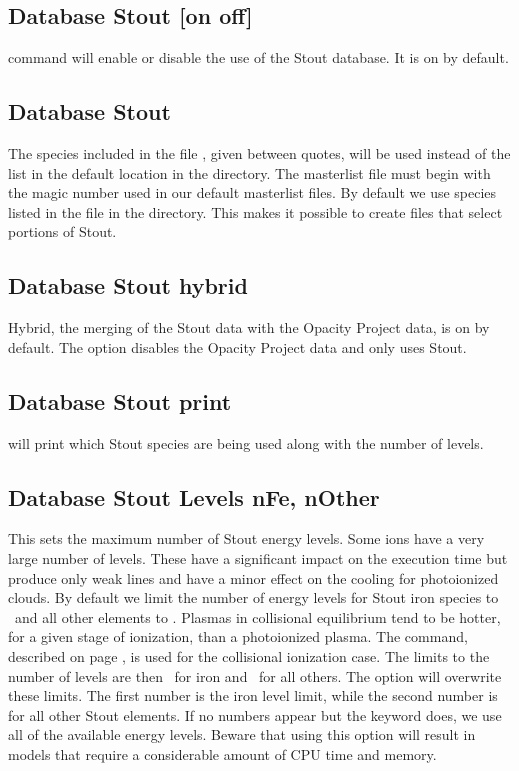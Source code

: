 \subsection{Database Stout [on off]} 
command will enable or disable the use of the Stout database.
It is on by default.

\subsection{Database Stout }
The species included in the file , given between quotes, will be used
instead of the list in the default location in the  directory.
The masterlist file must begin with the magic number used in our default masterlist files.
By default we use species listed in the  file in the 
 directory.
This makes it possible to create  files that select portions of Stout.

\subsection{Database Stout hybrid} 
Hybrid, the merging of the Stout data with the Opacity Project data, 
is on by default.
The  option disables the Opacity Project data 
and only uses Stout.

\subsection{Database Stout print} 
will print which Stout species are being used
along with the number of levels.

\subsection{Database Stout Levels nFe, nOther} 
This sets the maximum number of Stout energy levels. 
Some ions have a very large number of levels.
These have a significant impact
on the execution time but produce only weak lines and have a minor effect
on the cooling for photoionized clouds.
By default we limit the number of energy levels for Stout iron species to 
\nDefaultPhotoLevelsFe\ and all other elements to \nDefaultPhotoLevels.
Plasmas in collisional equilibrium tend to be hotter, for a given
stage of ionization, than a photoionized plasma.  
The  command, described on
page \pageref{sec:CommandCoronalEquilibrium}, is used for
the collisional ionization case.
The limits to the number of levels are then \nDefaultCollLevelsFe\ for iron 
and \nDefaultCollLevels\ for all others.
The  option will overwrite these limits.
The first number is the iron level limit, while the second number 
is for all other Stout elements.
If no numbers appear but the keyword  does, we use all 
of the available energy levels.
Beware that using this option
will result in models that require a considerable amount of CPU time and memory.

